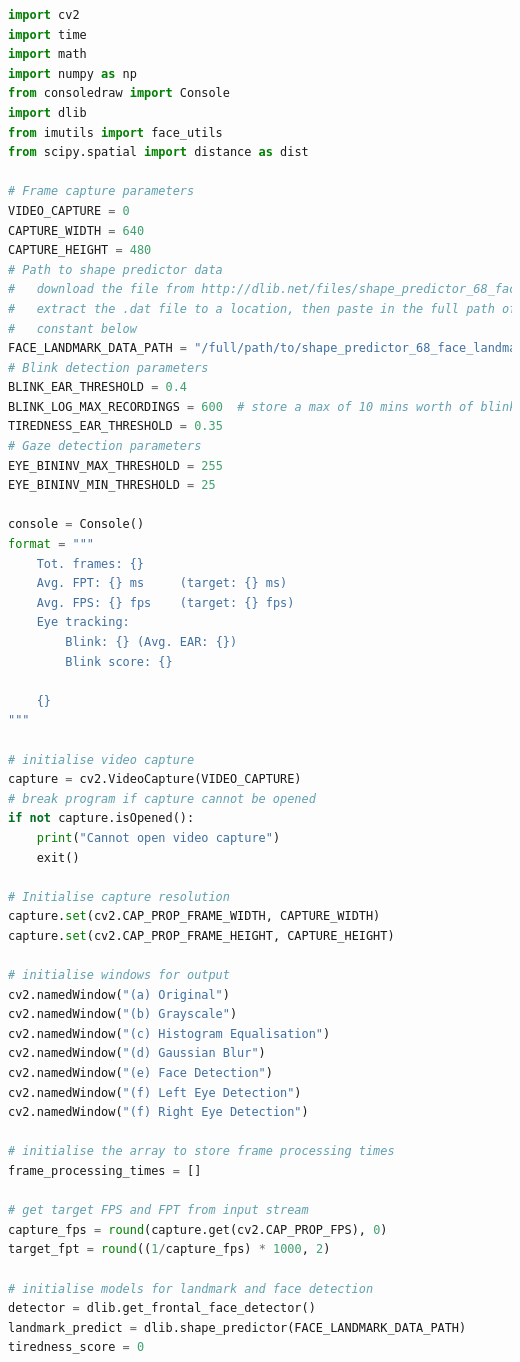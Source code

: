 \documentclass[10pt,conference]{IEEEtran}
\begin{document}
\begin{lstlisting}[language=Python,basicstyle=\tiny, showspaces=false, showstringspaces=false tabsize=1, breaklines=true]
import cv2
import time
import math
import numpy as np
from consoledraw import Console
import dlib
from imutils import face_utils
from scipy.spatial import distance as dist

# Frame capture parameters
VIDEO_CAPTURE = 0
CAPTURE_WIDTH = 640
CAPTURE_HEIGHT = 480
# Path to shape predictor data
#   download the file from http://dlib.net/files/shape_predictor_68_face_landmarks.dat.bz2,
#   extract the .dat file to a location, then paste in the full path of the .dat file in the
#   constant below
FACE_LANDMARK_DATA_PATH = "/full/path/to/shape_predictor_68_face_landmarks.dat"
# Blink detection parameters
BLINK_EAR_THRESHOLD = 0.4
BLINK_LOG_MAX_RECORDINGS = 600  # store a max of 10 mins worth of blink logs for 30 FPS footage
TIREDNESS_EAR_THRESHOLD = 0.35
# Gaze detection parameters
EYE_BININV_MAX_THRESHOLD = 255
EYE_BININV_MIN_THRESHOLD = 25

console = Console()
format = """
    Tot. frames: {}
    Avg. FPT: {} ms     (target: {} ms)
    Avg. FPS: {} fps    (target: {} fps)
    Eye tracking:
        Blink: {} (Avg. EAR: {})
        Blink score: {}

    {}
"""

# initialise video capture
capture = cv2.VideoCapture(VIDEO_CAPTURE)
# break program if capture cannot be opened
if not capture.isOpened():
    print("Cannot open video capture")
    exit()

# Initialise capture resolution
capture.set(cv2.CAP_PROP_FRAME_WIDTH, CAPTURE_WIDTH)
capture.set(cv2.CAP_PROP_FRAME_HEIGHT, CAPTURE_HEIGHT)

# initialise windows for output
cv2.namedWindow("(a) Original")
cv2.namedWindow("(b) Grayscale")
cv2.namedWindow("(c) Histogram Equalisation")
cv2.namedWindow("(d) Gaussian Blur")
cv2.namedWindow("(e) Face Detection")
cv2.namedWindow("(f) Left Eye Detection")
cv2.namedWindow("(f) Right Eye Detection")

# initialise the array to store frame processing times
frame_processing_times = []

# get target FPS and FPT from input stream
capture_fps = round(capture.get(cv2.CAP_PROP_FPS), 0)
target_fpt = round((1/capture_fps) * 1000, 2)

# initialise models for landmark and face detection 
detector = dlib.get_frontal_face_detector() 
landmark_predict = dlib.shape_predictor(FACE_LANDMARK_DATA_PATH)
tiredness_score = 0


\end{lstlisting}
\end{document}
